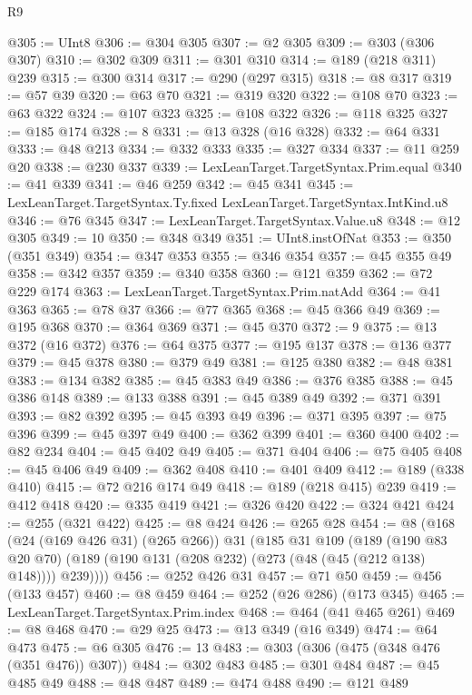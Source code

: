 \begin{lexlean}{R9}
\begin{coremodule}
{{{{{{{{{{{{{{{{{{{{{@305 := UInt8
@306 := @304 @305
@307 := @2 @305
@309 := @303 (@306 @307)
@310 := @302 @309
@311 := @301 @310
@314 := @189 (@218 @311) @239
@315 := @300 @314
@317 := @290 (@297 @315)
@318 := @8 @317
@319 := @57 @39
@320 := @63 @70
@321 := @319 @320
@322 := @108 @70
@323 := @63 @322
@324 := @107 @323
@325 := @108 @322
@326 := @118 @325
@327 := @185 @174
@328 := 8
@331 := @13 @328 (@16 @328)
@332 := @64 @331
@333 := @48 @213
@334 := @332 @333
@335 := @327 @334
@337 := @11 @259 @20
@338 := @230 @337
@339 := LexLeanTarget.TargetSyntax.Prim.equal
@340 := @41 @339
@341 := @46 @259
@342 := @45 @341
@345 := LexLeanTarget.TargetSyntax.Ty.fixed LexLeanTarget.TargetSyntax.IntKind.u8
@346 := @76 @345
@347 := LexLeanTarget.TargetSyntax.Value.u8
@348 := @12 @305
@349 := 10
@350 := @348 @349
@351 := UInt8.instOfNat
@353 := @350 (@351 @349)
@354 := @347 @353
@355 := @346 @354
@357 := @45 @355 @49
@358 := @342 @357
@359 := @340 @358
@360 := @121 @359
@362 := @72 @229 @174
@363 := LexLeanTarget.TargetSyntax.Prim.natAdd
@364 := @41 @363
@365 := @78 @37
@366 := @77 @365
@368 := @45 @366 @49
@369 := @195 @368
@370 := @364 @369
@371 := @45 @370
@372 := 9
@375 := @13 @372 (@16 @372)
@376 := @64 @375
@377 := @195 @137
@378 := @136 @377
@379 := @45 @378
@380 := @379 @49
@381 := @125 @380
@382 := @48 @381
@383 := @134 @382
@385 := @45 @383 @49
@386 := @376 @385
@388 := @45 @386 @148
@389 := @133 @388
@391 := @45 @389 @49
@392 := @371 @391
@393 := @82 @392
@395 := @45 @393 @49
@396 := @371 @395
@397 := @75 @396
@399 := @45 @397 @49
@400 := @362 @399
@401 := @360 @400
@402 := @82 @234
@404 := @45 @402 @49
@405 := @371 @404
@406 := @75 @405
@408 := @45 @406 @49
@409 := @362 @408
@410 := @401 @409
@412 := @189 (@338 @410)
@415 := @72 @216 @174 @49
@418 := @189 (@218 @415) @239
@419 := @412 @418
@420 := @335 @419
@421 := @326 @420
@422 := @324 @421
@424 := @255 (@321 @422)
@425 := @8 @424
@426 := @265 @28
@454 := @8
    (@168
      (@24 (@169 @426 @31) (@265 @266))
      @31
      (@185
        @31
        @109
        (@189
          (@190 @83 @20 @70)
          (@189 (@190 @131 (@208 @232) (@273 (@48 (@45 (@212 @138) @148)))) @239))))
@456 := @252 @426 @31
@457 := @71 @50
@459 := @456 (@133 @457)
@460 := @8 @459
@464 := @252 (@26 @286) (@173 @345)
@465 := LexLeanTarget.TargetSyntax.Prim.index
@468 := @464 (@41 @465 @261)
@469 := @8 @468
@470 := @29 @25
@473 := @13 @349 (@16 @349)
@474 := @64 @473
@475 := @6 @305
@476 := 13
@483 := @303 (@306 (@475 (@348 @476 (@351 @476)) @307))
@484 := @302 @483
@485 := @301 @484
@487 := @45 @485 @49
@488 := @48 @487
@489 := @474 @488
@490 := @121 @489
}}}}}}}}}}}}}}}}}}}}}
\end{coremodule}
\end{lexlean}
